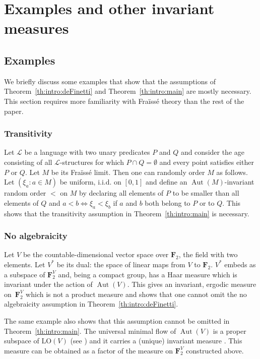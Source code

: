 \documentclass[JEP,XML,SOM,Unicode,published]{cedram}
\let\mathcal\mathscr
\theoremstyle{plain}
\theoremstyle{definition}
\newcommand{\bF}{{\mathbf F}}
\newcommand{\cL}{\mathcal{L}}
\DeclareMathOperator{\Aut}{Aut}
\newcommand{\LO}{\mathrm{LO}}
\begin{document}
\section{Examples and other invariant measures}
\label{sec:examples}

\subsection{Examples}
\label{sec:examples-1}

We briefly discuss some examples that show that the assumptions of Theorem~\ref{th:intro:deFinetti} and Theorem~\ref{th:intro:main} are mostly necessary. This section requires more familiarity with Fraïssé theory than the rest of the paper.\enlargethispage{.5\baselineskip}%

\subsubsection{Transitivity} Let $\cL$ be a language with two unary predicates $P$ and $Q$ and consider the age consisting of all $\cL$-structures for which $P \cap Q = \emptyset$ and every point satisfies either $P$ or $Q$. Let $M$ be its Fraïssé limit. Then one can randomly order $M$ as follows. Let $(\xi_a : a \in M)$ be uniform, i.i.d. on $[0, 1]$ and define an $\Aut(M)$-invariant random order $<$ on $M$ by declaring all elements of $P$ to be smaller than all elements of $Q$ and $a < b \iff \xi_a < \xi_b$ if $a$ and $b$ both belong to $P$ or to $Q$. This shows that the transitivity assumption in Theorem~\ref{th:intro:main} is necessary.

\subsubsection{No algebraicity} Let $V$ be the countable-dimensional vector space over $\bF_2$, the field with two elements. Let $V^*$ be its dual: the space of linear maps from $V$ to $\bF_2$. $V^*$ embeds as a subspace of $\bF_2^V$ and, being a compact group, has a Haar measure which is invariant under the action of $\Aut(V)$. This gives an invariant, ergodic measure on~$\bF_2^V$ which is not a product measure and shows that one cannot omit the no algebraicity assumption in Theorem~\ref{th:intro:deFinetti}.

The same example also shows that this assumption cannot be omitted in Theorem~\ref{th:intro:main}. The universal minimal flow of $\Aut(V)$ is a proper subspace of $\LO(V)$ (see \cite[Th.\,8.2]{Kechris2005}) and it carries a (unique) invariant measure \cite[\S10]{Angel2014}. This measure can be obtained as a factor of the measure on $\bF_2^V$ constructed above.
\end{document}
